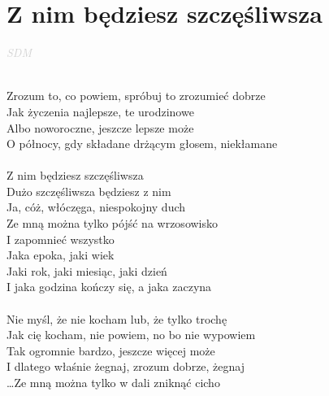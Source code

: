 \documentclass[a5paper, 10pt]{book}
\begin{document}
\newpage
\section{Z nim będziesz szczęśliwsza}\textcolor{lightgray}{\textit{SDM}}\\~\\
\begin{minipage}[t]{0.8\textwidth}
  Zrozum to, co powiem, spróbuj to zrozumieć dobrze\\
  Jak życzenia najlepsze, te urodzinowe\\
  Albo noworoczne, jeszcze lepsze może\\
  O północy, gdy składane drżącym głosem, niekłamane\\
  \\
  \hspace*{5mm}Z nim będziesz szczęśliwsza\\
  \hspace*{5mm}Dużo szczęśliwsza będziesz z nim\\
  \hspace*{5mm}Ja, cóż, włóczęga, niespokojny duch\\
  \hspace*{5mm}Ze mną można tylko pójść na wrzosowisko\\
  \hspace*{5mm}I zapomnieć wszystko\\
  \hspace*{5mm}Jaka epoka, jaki wiek\\
  \hspace*{5mm}Jaki rok, jaki miesiąc, jaki dzień\\
  \hspace*{5mm}I jaka godzina kończy się, a jaka zaczyna\\
  \\
  Nie myśl, że nie kocham lub, że tylko trochę\\
  Jak cię kocham, nie powiem, no bo nie wypowiem\\
  Tak ogromnie bardzo, jeszcze więcej może\\
  I dlatego właśnie żegnaj, zrozum dobrze, żegnaj\\

  \ldots Ze mną można tylko w dali zniknąć cicho\\

\end{minipage}
\end{document}
